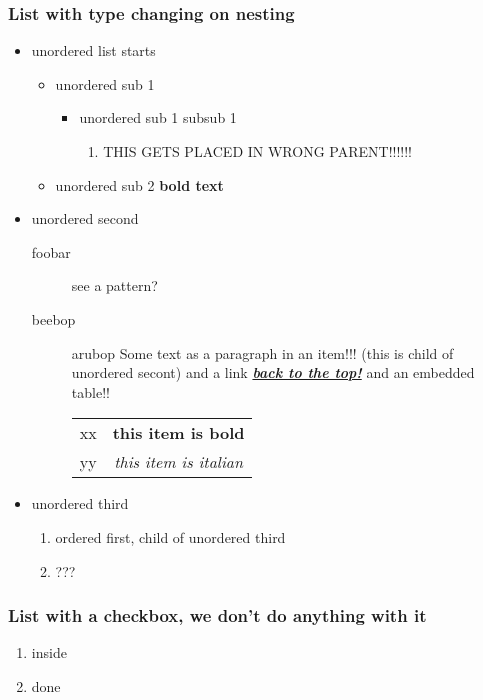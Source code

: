 \documentclass[11pt]{article}
\begin{document}
\subsubsection{List with type changing on nesting  }
 \label{obj-137}
 \label{obj-136}
\begin{itemize}
\item
unordered list starts
\begin{itemize}
\item
unordered sub 1
\begin{itemize}
\item
unordered sub 1 subsub 1
\begin{enumerate}
\item
THIS GETS PLACED IN WRONG PARENT!!!!!!
\end{enumerate}
\end{itemize}
\item
unordered sub 2
\textbf{bold text}
\end{itemize}
\item
unordered second 
\begin{description}
\item[foobar]
see a pattern?
\item[beebop]
arubop
\label{obj-164} 
  Some text as a paragraph in an item!!! (this is child of unordered secont)
and a link
\hyperref[obj-15]{\textbf{\emph{back to the top!}}}
  and an embedded table!!

\begin{tabular}{|c|c|}
\hline
 xx  & \textbf{this item is bold} \\
 yy  & \emph{this item is italian} \\
\hline
\end{tabular}
\end{description}
\item
unordered third
\begin{enumerate}
\item
ordered first, child of unordered third
\item
???
\end{enumerate}
\vspace{\baselineskip}
\vspace{\baselineskip}
\end{itemize}
\vspace{\baselineskip}
\subsubsection{List with a checkbox, we don't do anything with it  }
 \label{obj-195}
 \label{obj-194}
\begin{enumerate}
\item
inside
\item
done
\vspace{\baselineskip}
\vspace{\baselineskip}
\end{enumerate}
\end{document}
